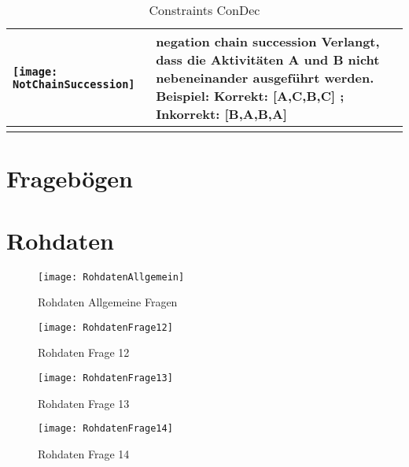 \begin{longtable}{|p{}|p{}|}
\hline
\begin{center}

  \texttt{[image: NotChainSuccession]} %
    \end{center} &
\textbf{negation chain succession}\newline
  Verlangt, dass die Aktivitäten A und B nicht nebeneinander ausgeführt werden.
  \newline
  Beispiel: Korrekt: [A,C,B,C] ; Inkorrekt: [B,A,B,A] \\
\hline

 \caption{Constraints ConDec \cite{Montali2010, Pesic200}}
 \end{longtable}

\chapter{Fragebögen}




\chapter{Rohdaten}

\begin{sidewaysfigure}[!htbp]
\begin{center}
  \texttt{[image: RohdatenAllgemein]} %
  \caption{Rohdaten Allgemeine Fragen}
  \label{fig:BPM_2}
\end{center}
\end{sidewaysfigure}

\begin{sidewaysfigure}[!htbp]
\begin{center}
  \texttt{[image: RohdatenFrage12]} %
  \caption{Rohdaten Frage 12}
  \label{fig:BPM_2}
\end{center}
\end{sidewaysfigure}

\begin{sidewaysfigure}[!htbp]
\begin{center}
  \texttt{[image: RohdatenFrage13]} %
  \caption{Rohdaten Frage 13}
  \label{fig:BPM_2}
\end{center}
\end{sidewaysfigure}

\begin{sidewaysfigure}[!htbp]
\begin{center}
  \texttt{[image: RohdatenFrage14]} %
  \caption{Rohdaten Frage 14}
  \label{fig:BPM_2}
\end{center}
\end{sidewaysfigure}

